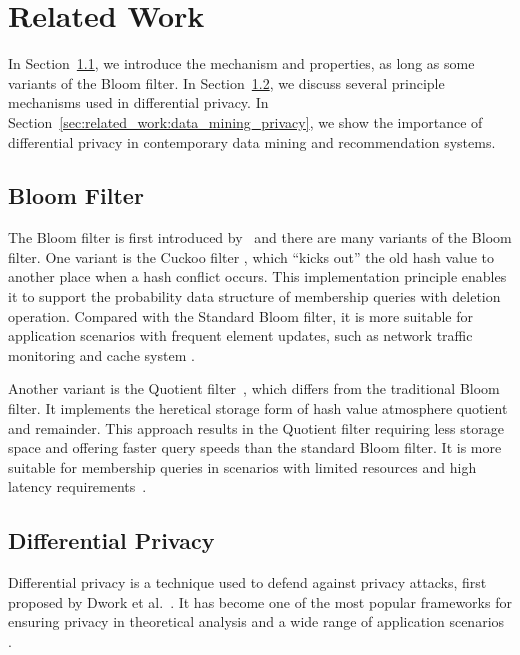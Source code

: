 \section{Related Work}
\label{sec:related_work}

In Section~\ref{sec:related_word:bloom_filter}, we introduce the mechanism and properties, as long as some variants of the Bloom filter.
In Section~\ref{sec:related_work:dp}, we discuss several principle mechanisms used in differential privacy.
In Section~\ref{sec:related_work:data_mining_privacy}, we show the importance of differential privacy in contemporary data mining and recommendation systems. 

\subsection{Bloom Filter} \label{sec:related_word:bloom_filter}


The Bloom filter is first introduced by~\cite{b70} and 
there are many variants of the Bloom filter. One variant is the Cuckoo filter \cite{fakm14}, which ``kicks out'' the old hash value to another place when a hash conflict occurs. This implementation principle enables it to support the probability data structure of membership queries with deletion operation. Compared with the Standard Bloom filter, it is more suitable for application scenarios with frequent element updates, such as network traffic monitoring \cite{gjh18} and cache system \cite{wyqk22}.

Another variant is the Quotient filter~\cite{gfo18}, which differs from the traditional Bloom filter. It implements the heretical storage form of hash value atmosphere quotient and remainder. 
This approach results in the Quotient filter requiring less storage space and offering faster query speeds than the standard Bloom filter.
It is more suitable for membership queries in scenarios with limited resources and high latency requirements~\cite{pcd+21, aa16}.

\subsection{Differential Privacy} \label{sec:related_work:dp}

Differential privacy is a technique used to defend against privacy attacks, first proposed 
by Dwork et al.~\cite{dmns06}. It has become one of the most popular frameworks for ensuring privacy in theoretical analysis and a wide range of application scenarios 
\cite{llsy17, ygz+23,wcy+23,cxj24, sg24, gls+25, gll+24d,llsz24_nn_tw,lls+24_dp_je, gls+24d, fll24, syyz23, lhr+24, hll+24, ylh+24}. 


